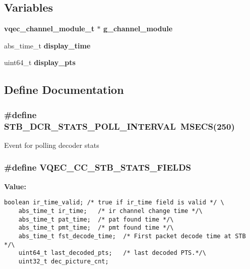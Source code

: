 \subsection*{Variables}
\begin{CompactItemize}
\item 
\bf{vqec\_\-channel\_\-module\_\-t} $\ast$ \bf{g\_\-channel\_\-module}
\item 
abs\_\-time\_\-t \bf{display\_\-time}
\item 
uint64\_\-t \bf{display\_\-pts}
\end{CompactItemize}


\subsection{Define Documentation}
\subsubsection{\setlength{\rightskip}{0pt plus 5cm}\#define STB\_\-DCR\_\-STATS\_\-POLL\_\-INTERVAL~MSECS(250)}\label{vqec__channel__private_8h_c432722e0ec876b96ec98d0fe1e8d28f}


Event for polling decoder stats 
\subsubsection{\setlength{\rightskip}{0pt plus 5cm}\#define VQEC\_\-CC\_\-STB\_\-STATS\_\-FIELDS}\label{vqec__channel__private_8h_3e58d60c53838a2c22ea88478660e993}


\textbf{Value:}

\begin{Code}\begin{verbatim}boolean ir_time_valid; /* true if ir_time field is valid */ \
    abs_time_t ir_time;   /* ir channel change time */\
    abs_time_t pat_time;  /* pat found time */\
    abs_time_t pmt_time;  /* pmt found time */\
    abs_time_t fst_decode_time;  /* First packet decode time at STB */\
    uint64_t last_decoded_pts;   /* last decoded PTS.*/\
    uint32_t dec_picture_cnt;
\end{verbatim}\end{Code}
